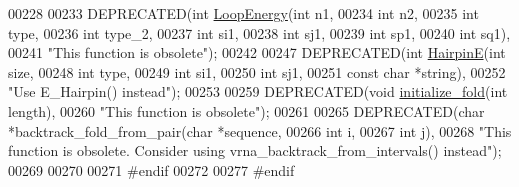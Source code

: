 \begin{DoxyCode}
00228 
00233 DEPRECATED(\textcolor{keywordtype}{int} \hyperlink{group__mfe__global__deprecated_ga2163034a25c6115d894b199e97e03f6c}{LoopEnergy}(\textcolor{keywordtype}{int} n1,
00234                           \textcolor{keywordtype}{int} n2,
00235                           \textcolor{keywordtype}{int} type,
00236                           \textcolor{keywordtype}{int} type\_2,
00237                           \textcolor{keywordtype}{int} si1,
00238                           \textcolor{keywordtype}{int} sj1,
00239                           \textcolor{keywordtype}{int} sp1,
00240                           \textcolor{keywordtype}{int} sq1),
00241 \textcolor{stringliteral}{"This function is obsolete"});
00242 
00247 DEPRECATED(\textcolor{keywordtype}{int} \hyperlink{group__mfe__global__deprecated_gab327ce11972f5ac069d52c8dedfdb700}{HairpinE}(\textcolor{keywordtype}{int} size,
00248                         \textcolor{keywordtype}{int} type,
00249                         \textcolor{keywordtype}{int} si1,
00250                         \textcolor{keywordtype}{int} sj1,
00251                         \textcolor{keyword}{const} \textcolor{keywordtype}{char} *\textcolor{keywordtype}{string}),
00252 \textcolor{stringliteral}{"Use E\_Hairpin() instead"});
00253 
00259 DEPRECATED(\textcolor{keywordtype}{void} \hyperlink{group__mfe__global__deprecated_gac3f0a28d9cb609d388b155445073fd20}{initialize\_fold}(\textcolor{keywordtype}{int} length),
00260 \textcolor{stringliteral}{"This function is obsolete"});
00261 
00265 DEPRECATED(\textcolor{keywordtype}{char} *backtrack\_fold\_from\_pair(\textcolor{keywordtype}{char} *sequence,
00266                                           \textcolor{keywordtype}{int} i,
00267                                           \textcolor{keywordtype}{int} j),
00268 \textcolor{stringliteral}{"This function is obsolete. Consider using vrna\_backtrack\_from\_intervals() instead"});
00269 
00270 
00271 \textcolor{preprocessor}{#endif}
00272 
00277 \textcolor{preprocessor}{#endif}
\end{DoxyCode}
